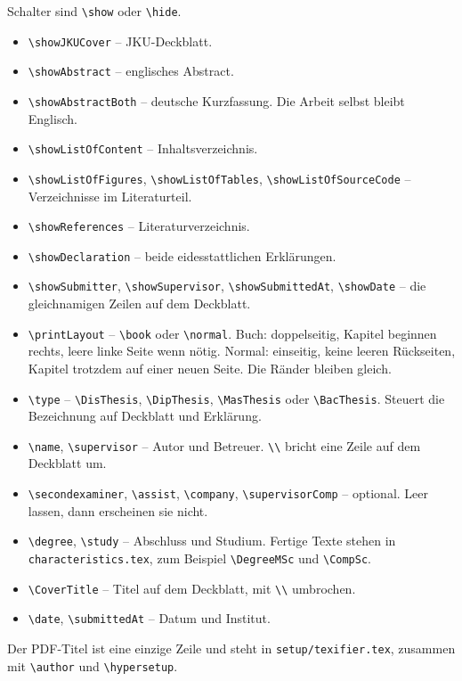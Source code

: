 \documentclass[11pt,a4paper]{article}
\begin{document}
Schalter sind \verb|\show| oder \verb|\hide|.

\begin{itemize}
\item \verb|\showJKUCover| -- JKU-Deckblatt.
\item \verb|\showAbstract| -- englisches Abstract.
\item \verb|\showAbstractBoth| -- deutsche Kurzfassung. Die Arbeit selbst bleibt Englisch.
\item \verb|\showListOfContent| -- Inhaltsverzeichnis.
\item \verb|\showListOfFigures|, \verb|\showListOfTables|, \verb|\showListOfSourceCode| -- Verzeichnisse im Literaturteil.
\item \verb|\showReferences| -- Literaturverzeichnis.
\item \verb|\showDeclaration| -- beide eidesstattlichen Erklärungen.
\item \verb|\showSubmitter|, \verb|\showSupervisor|, \verb|\showSubmittedAt|, \verb|\showDate| -- die gleichnamigen Zeilen auf dem Deckblatt.
\item \verb|\printLayout| -- \verb|\book| oder \verb|\normal|. Buch: doppelseitig, Kapitel beginnen rechts, leere linke Seite wenn nötig. Normal: einseitig, keine leeren Rückseiten, Kapitel trotzdem auf einer neuen Seite. Die Ränder bleiben gleich.
\item \verb|\type| -- \verb|\DisThesis|, \verb|\DipThesis|, \verb|\MasThesis| oder \verb|\BacThesis|. Steuert die Bezeichnung auf Deckblatt und Erklärung.
\item \verb|\name|, \verb|\supervisor| -- Autor und Betreuer. \verb|\\| bricht eine Zeile auf dem Deckblatt um.
\item \verb|\secondexaminer|, \verb|\assist|, \verb|\company|, \verb|\supervisorComp| -- optional. Leer lassen, dann erscheinen sie nicht.
\item \verb|\degree|, \verb|\study| -- Abschluss und Studium. Fertige Texte stehen in \texttt{characteristics.tex}, zum Beispiel \verb|\DegreeMSc| und \verb|\CompSc|.
\item \verb|\CoverTitle| -- Titel auf dem Deckblatt, mit \verb|\\| umbrochen.
\item \verb|\date|, \verb|\submittedAt| -- Datum und Institut.
\end{itemize}

Der PDF-Titel ist eine einzige Zeile und steht in \texttt{setup/texifier.tex}, zusammen mit \verb|\author| und \verb|\hypersetup|.
\end{document}
